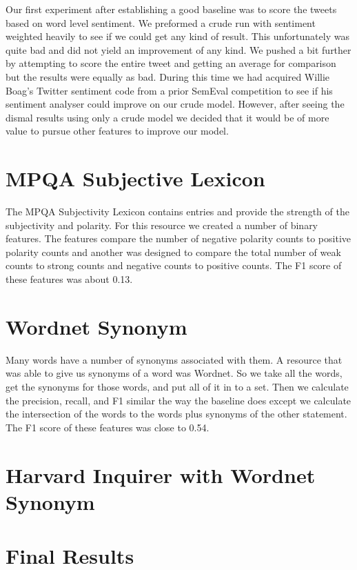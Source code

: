 \documentclass[11pt,letterpaper]{article}
\begin{document}

Our first experiment after establishing a good baseline was to score the tweets based on word level sentiment. We preformed a crude run with sentiment weighted heavily to see if we could get any kind of result. This unfortunately was quite bad and did not yield an improvement of any kind. We pushed a bit further by attempting to score the entire tweet and getting an average for comparison but the results were equally as bad. During this time we had acquired Willie Boag's Twitter sentiment code from a prior SemEval competition to see if his sentiment analyser could improve on our crude model. However, after seeing the dismal results using only a crude model we decided that it would be of more value to pursue other features to improve our model.

\section{MPQA Subjective Lexicon}
The MPQA Subjectivity Lexicon contains entries and provide the strength of the subjectivity and polarity. For this resource we created a number of binary features. The features compare the number of negative polarity counts to positive polarity counts and another was designed to compare the total number of weak counts to strong counts and negative counts to positive counts. The F1 score of these features was about 0.13.


\section{Wordnet Synonym}
Many words have a number of synonyms associated with them. A resource that was able to give us synonyms of a word was Wordnet. So we take all the words, get the synonyms for those words, and put all of it in to a set. Then we calculate the precision, recall, and F1 similar the way the baseline does except we calculate the intersection of the words to the words plus synonyms of the other statement. The F1 score of these features was close to 0.54.

\section{Harvard Inquirer with Wordnet Synonym}

\section{Final Results}
\end{document}
